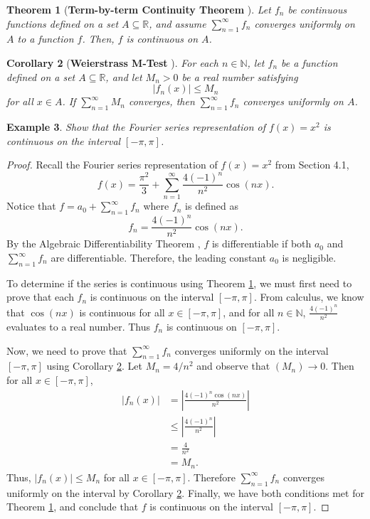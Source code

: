 \documentclass[11pt]{amsart}
\theoremstyle{plain}
\newtheorem{theorem}{Theorem}[section]
\newtheorem{corollary}[theorem]{Corollary}
\newtheorem{eg}[theorem]{Example}
\theoremstyle{definition}
\newcommand{\N}{\mathbb N}
\newcommand{\R}{\mathbb R}
\begin{document}
\begin{theorem}[\textbf{Term-by-term Continuity Theorem} \cite{Abbott}]\label{thm:continuity}
    Let $f_n$ be continuous functions defined on a set $A\subseteq\R$, and assume $\sum_{n=1}^\infty f_n$ converges uniformly on $A$ to a function $f$. Then, $f$ is continuous on $A$.
\end{theorem}

\begin{corollary}[\textbf{Weierstrass M-Test} \cite{Abbott}]\label{weier}
    For each $n\in \N$, let $f_n$ be a function defined on a set $A\subseteq \R$, and let $M_n>0$ be a real number satisfying \[|f_n(x)|\leq M_n\] for all $x\in A$. If $\sum_{n=1}^\infty M_n$ converges, then $\sum_{n=1}^\infty f_n$ converges uniformly on $A$.
\end{corollary}
 
\begin{eg}
    Show that the Fourier series representation of $f(x)=x^2$ is continuous on the interval $[-\pi,\pi]$. 
\end{eg}
\begin{proof}
    Recall the Fourier series representation of $f(x)=x^2$ from Section 4.1, \[f(x)=\dfrac{\pi^2}{3}+\sum_{n=1}^\infty \dfrac{4(-1)^n}{n^2}\cos(nx).\] Notice that $f=a_0+\sum_{n=1}^\infty f_n$ where $f_n$ is defined as \[f_n= \dfrac{4(-1)^n}{n^2}\cos(nx).\] By the Algebraic Differentiability Theorem \cite{Abbott}, $f$ is differentiable if both $a_0$ and $\sum_{n=1}^\infty f_n$ are differentiable. Therefore, the leading constant $a_0$ is negligible.
    
    To determine if the series is continuous using Theorem \ref{thm:continuity}, we must first need to prove that each $f_n$ is continuous on the interval $[-\pi,\pi]$. From calculus, we know that $\cos(nx)$ is continuous for all $x\in [-\pi,\pi]$, and for all $n\in\N$, $\frac{4(-1)^n}{n^2}$ evaluates to a real number. Thus $f_n$ is continuous on $[-\pi,\pi]$. 
    
    Now, we need to prove that $\sum_{n=1}^\infty f_n$ converges uniformly on the interval $[-\pi,\pi]$ using Corollary \ref{weier}. Let $M_n= 4/n^2$ and observe that $(M_n)\to 0$. Then for all $x\in [-\pi,\pi]$,
    \begin{align*}
        |f_n(x)| &= \left|\frac{4(-1)^n\cos(nx)}{n^2}\right| \\
        &\leq \left|\frac{4(-1)^n}{n^2}\right|\\
        &= \frac{4}{n^2}\\
        &= M_n.
    \end{align*}
    Thus, $|f_n(x)|\leq M_n$ for all $x\in [-\pi,\pi]$. Therefore $\sum_{n=1}^\infty f_n$ converges uniformly on the interval by Corollary \ref{weier}. Finally, we have both conditions met for Theorem \ref{thm:continuity}, and conclude that $f$ is continuous on the interval $[-\pi,\pi]$. 
\end{proof}
\end{document}
